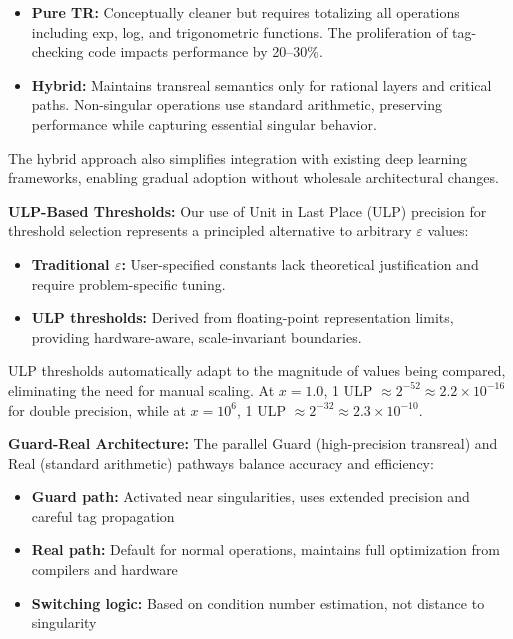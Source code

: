 \documentclass[twoside,11pt]{article}
\begin{document}
\begin{itemize}
\item \textbf{Pure TR:} Conceptually cleaner but requires totalizing all operations including exp, log, and trigonometric functions. The proliferation of tag-checking code impacts performance by 20--30\%.
\item \textbf{Hybrid:} Maintains transreal semantics only for rational layers and critical paths. Non-singular operations use standard arithmetic, preserving performance while capturing essential singular behavior.
\end{itemize}

The hybrid approach also simplifies integration with existing deep learning frameworks, enabling gradual adoption without wholesale architectural changes.

\textbf{ULP-Based Thresholds:} Our use of Unit in Last Place (ULP) precision for threshold selection represents a principled alternative to arbitrary $\varepsilon$ values:

\begin{itemize}
\item \textbf{Traditional $\varepsilon$:} User-specified constants lack theoretical justification and require problem-specific tuning.
\item \textbf{ULP thresholds:} Derived from floating-point representation limits, providing hardware-aware, scale-invariant boundaries.
\end{itemize}

ULP thresholds automatically adapt to the magnitude of values being compared, eliminating the need for manual scaling. At $x = 1.0$, 1 ULP $\approx 2^{-52} \approx 2.2 \times 10^{-16}$ for double precision, while at $x = 10^6$, 1 ULP $\approx 2^{-32} \approx 2.3 \times 10^{-10}$.

\textbf{Guard-Real Architecture:} The parallel Guard (high-precision transreal) and Real (standard arithmetic) pathways balance accuracy and efficiency:

\begin{itemize}
\item \textbf{Guard path:} Activated near singularities, uses extended precision and careful tag propagation
\item \textbf{Real path:} Default for normal operations, maintains full optimization from compilers and hardware
\item \textbf{Switching logic:} Based on condition number estimation, not distance to singularity
\end{itemize}
\end{document}
